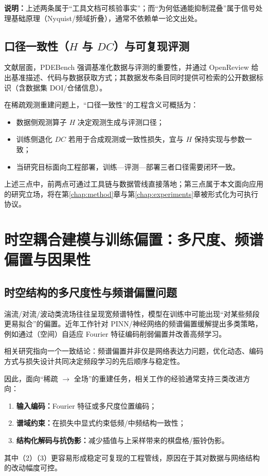 \noindent\textbf{说明：}上述两条属于“工具文档可核验事实”；而“为何低通能抑制混叠”属于信号处理基础原理（Nyquist/频域折叠），通常不依赖单一论文出处。


\subsection{口径一致性（\texorpdfstring{$H$}{H} 与 \texorpdfstring{$DC$}{DC}）与可复现评测}\label{subsec:rw_consistency}

文献层面，PDEBench 强调基准化数据与评测的重要性，并通过 OpenReview 给出基准描述、代码与数据获取方式\cite{takamoto2022pdebench}；其数据发布条目同时提供可检索的公开数据标识（含数据集 DOI/仓储信息）\cite{takamoto2022pdebench}。

在稀疏观测重建问题上，“口径一致性”的工程含义可概括为：
\begin{itemize}
  \item 数据侧观测算子 $H$ 决定观测生成与评测口径；
  \item 训练侧退化 $DC$ 若用于合成观测或一致性损失，宜与 $H$ 保持实现与参数一致；
  \item 当研究目标面向工程部署，训练—评测—部署三者口径需要闭环一致。
\end{itemize}

上述三点中，前两点可通过工具链与数据管线直接落地；第三点属于本文面向应用的研究立场，将在第\ref{chap:method}章与第\ref{chap:experiments}章被形式化为可执行协议。


\section{时空耦合建模与训练偏置：多尺度、频谱偏置与因果性}\label{sec:rw_spatiotemporal}

\subsection{时空结构的多尺度性与频谱偏置问题}\label{subsec:rw_spectralbias}

湍流/对流/波动类流场往往呈现宽频谱特性，模型在训练中可能出现“对某些频段更易拟合”的偏置。近年工作针对 PINN/神经网络的频谱偏置缓解提出多类策略，例如通过（空间）自适应 Fourier 特征编码削弱偏置并改善高频学习\cite{liu2025diminishing_spectral_bias}。

相关研究指向一个一致结论：频谱偏置并非仅是网络表达力问题，优化动态、编码方式与损失设计共同决定频段学习的先后顺序与稳定性\cite{liu2025diminishing_spectral_bias}。

因此，面向“稀疏 $\rightarrow$ 全场”的重建任务，相关工作的经验通常支持三类改进方向：
\begin{enumerate}
  \item \textbf{输入编码：}Fourier 特征或多尺度位置编码；
  \item \textbf{谱域约束：}在损失中显式约束低频/中频结构一致性；
  \item \textbf{结构化解码与抗伪影：}减少插值与上采样带来的棋盘格/振铃伪影。
\end{enumerate}
其中（2）（3）更容易形成稳定可复现的工程管线，原因在于其对数据与网络结构的改动幅度可控。


